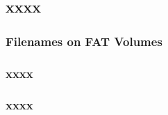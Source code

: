 \subsection{xxxx} %
\begin{frame}[fragile]
    \frametitle{Filenames on FAT Volumes}
\end{frame}
% 
% 
% 
\begin{frame}[fragile]
    \frametitle{xxxx}
\end{frame}
% 
% 
\begin{frame}[fragile]
    \frametitle{xxxx}
\end{frame}
% 

